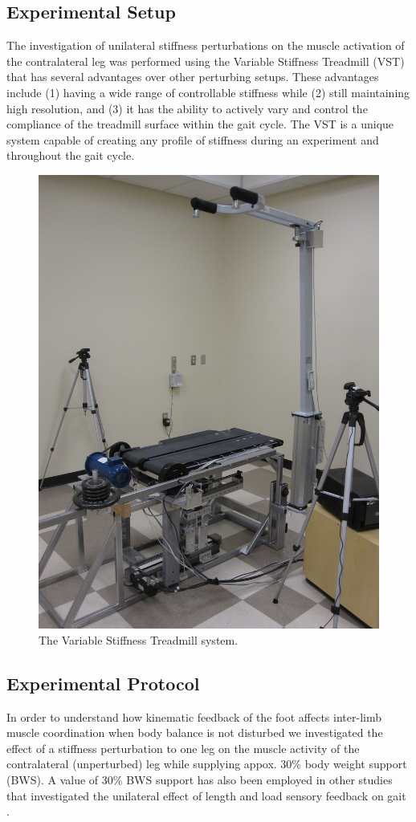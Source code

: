 \subsection{Experimental Setup}
The investigation of unilateral stiffness perturbations on the muscle activation of the contralateral leg was performed using the Variable Stiffness Treadmill (VST) \cite{Barkan_2014_Variable} that has several advantages over other perturbing setups.  These advantages include (1) having a wide range of controllable stiffness while (2) still maintaining high resolution, and (3) it has the ability to actively vary and control the compliance of the treadmill surface within the gait cycle.  The VST is a unique system capable of creating any profile of stiffness during an experiment and throughout the gait cycle.  

\begin{figure}
\centering
\includegraphics[width=0.7\columnwidth]{Figures/VSTsystem}
\caption{The Variable Stiffness Treadmill system.}
\label{setup}
\end{figure}

\subsection{Experimental Protocol}
In order to understand how kinematic feedback of the foot affects inter-limb muscle coordination when body balance is not disturbed we investigated the effect of a stiffness perturbation to one leg on the muscle activity of the contralateral (unperturbed) leg while supplying appox. 30\% body weight support (BWS).  A value of 30\% BWS support has also been employed in other studies that investigated the unilateral effect of length and load sensory feedback on gait \cite{Sinkjaer_2000_Major, AfKlint_2010_Load}.

